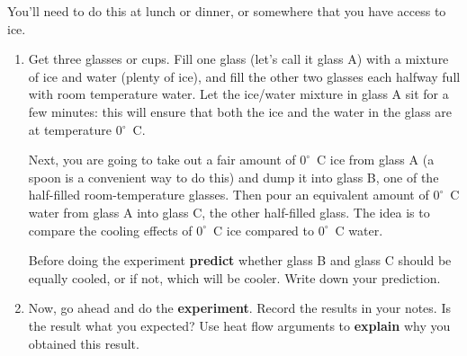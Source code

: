 \begin{exercise}  
  You'll need to do this at lunch or dinner, or somewhere that you
  have access to ice.
  \begin{enumerate}
  \item Get three glasses or cups.  Fill one glass (let's call it
    glass A) with a mixture of ice and water (plenty of ice), and fill
    the other two glasses each halfway full with room temperature
    water.  Let the ice/water mixture in glass A sit for a few
    minutes: this will ensure that both the ice and the water in the
    glass are at temperature 0$^\circ$~C.

    Next, you are going to take out a fair amount of $0^\circ$~C ice
    from glass A (a spoon is a convenient way to do this) and dump it
    into glass B, one of the half-filled room-temperature glasses.
    Then pour an equivalent amount of $0^\circ$~C water from glass A
    into glass C, the other half-filled glass.  The idea is to compare
    the cooling effects of $0^\circ$~C ice compared to $0^\circ$~C
    water.

    Before doing the experiment \textbf{predict} whether glass B and
    glass C should be equally cooled, or if not, which will be cooler.
    Write down your prediction.

  \item Now, go ahead and do the \textbf{experiment}.  Record the results
    in your notes.  Is the result what you expected?  Use heat flow
    arguments to \textbf{explain} why you obtained this result.

  \end{enumerate}

\end{exercise}


